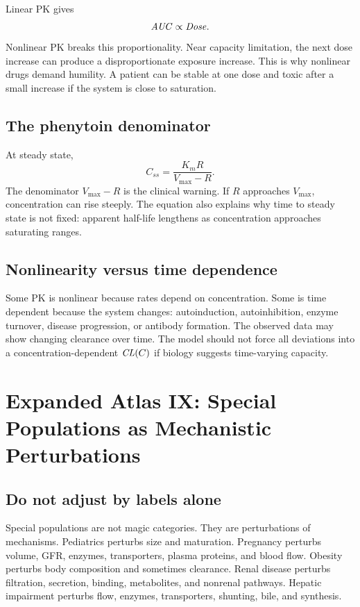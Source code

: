 Linear PK gives
\[
  \pkAUC\propto \pksym{Dose}.
\]
Nonlinear PK breaks this proportionality. Near capacity limitation, the next dose increase can produce a disproportionate exposure increase. This is why nonlinear drugs demand humility. A patient can be stable at one dose and toxic after a small increase if the system is close to saturation.

\subsection{The phenytoin denominator}

At steady state,
\[
  C_{ss}
  =
  \frac{K_mR}{V_{\max}-R}.
\]
The denominator \(V_{\max}-R\) is the clinical warning. If \(R\) approaches \(V_{\max}\), concentration can rise steeply. The equation also explains why time to steady state is not fixed: apparent half-life lengthens as concentration approaches saturating ranges.

\subsection{Nonlinearity versus time dependence}

Some PK is nonlinear because rates depend on concentration. Some is time dependent because the system changes: autoinduction, autoinhibition, enzyme turnover, disease progression, or antibody formation. The observed data may show changing clearance over time. The model should not force all deviations into a concentration-dependent \(\pkCL(C)\) if biology suggests time-varying capacity.

\section{Expanded Atlas IX: Special Populations as Mechanistic Perturbations}

\subsection{Do not adjust by labels alone}

Special populations are not magic categories. They are perturbations of mechanisms. Pediatrics perturbs size and maturation. Pregnancy perturbs volume, GFR, enzymes, transporters, plasma proteins, and blood flow. Obesity perturbs body composition and sometimes clearance. Renal disease perturbs filtration, secretion, binding, metabolites, and nonrenal pathways. Hepatic impairment perturbs flow, enzymes, transporters, shunting, bile, and synthesis.

